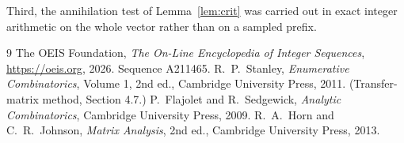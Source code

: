 \documentclass[11pt,a4paper]{article}
\theoremstyle{plain}
\theoremstyle{definition}
\begin{document}
Third, the annihilation test of Lemma~\ref{lem:crit} was carried out in exact integer
arithmetic on the whole vector rather than on a sampled prefix.

\begin{thebibliography}{9}
 The OEIS Foundation, \emph{The On-Line Encyclopedia of Integer
Sequences}, \url{https://oeis.org}, 2026. Sequence A211465.
 R.~P.~Stanley, \emph{Enumerative Combinatorics}, Volume 1, 2nd ed.,
Cambridge University Press, 2011. (Transfer-matrix method, Section 4.7.)
 P.~Flajolet and R.~Sedgewick, \emph{Analytic Combinatorics}, Cambridge
University Press, 2009.
 R.~A.~Horn and C.~R.~Johnson, \emph{Matrix Analysis}, 2nd ed., Cambridge
University Press, 2013.
\end{thebibliography}
\end{document}
